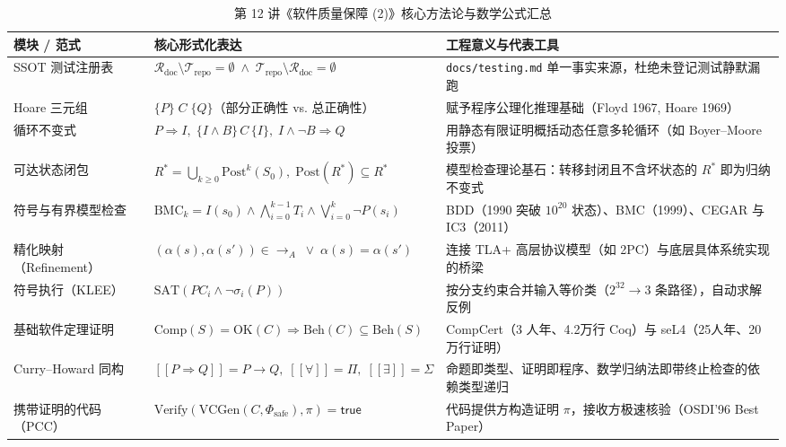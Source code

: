 \documentclass[a4paper]{article}
\begin{document}
\begin{table}[H]
\centering
\caption{第 12 讲《软件质量保障 (2)》核心方法论与数学公式汇总}
\label{tab:lecture12_summary}
\begin{tabular}{p{3.4cm}p{5.5cm}p{5.5cm}}
\toprule
\textbf{模块 / 范式} & \textbf{核心形式化表达} & \textbf{工程意义与代表工具} \\
\midrule
SSOT 测试注册表 & $\mathcal{R}_{\text{doc}} \setminus \mathcal{T}_{\text{repo}} = \emptyset \;\land\; \mathcal{T}_{\text{repo}} \setminus \mathcal{R}_{\text{doc}} = \emptyset$ & \texttt{docs/testing.md} 单一事实来源，杜绝未登记测试静默漏跑 \\
Hoare 三元组 & $\{P\}\; C\; \{Q\}$（部分正确性 vs. 总正确性） & 赋予程序公理化推理基础（Floyd 1967, Hoare 1969） \\
循环不变式 & $P \Rightarrow I,\; \{I \land B\}\, C\, \{I\},\; I \land \neg B \Rightarrow Q$ & 用静态有限证明概括动态任意多轮循环（如 Boyer--Moore 投票） \\
可达状态闭包 & $R^* = \bigcup_{k\ge 0} \mathrm{Post}^k(S_0),\; \mathrm{Post}(R^*) \subseteq R^*$ & 模型检查理论基石：转移封闭且不含坏状态的 $R^*$ 即为归纳不变式 \\
符号与有界模型检查 & $\mathrm{BMC}_k = I(s_0) \land \bigwedge_{i=0}^{k-1} T_i \land \bigvee_{i=0}^k \neg P(s_i)$ & BDD（1990 突破 $10^{20}$ 状态）、BMC（1999）、CEGAR 与 IC3（2011） \\
精化映射（Refinement） & $(\alpha(s), \alpha(s')) \in \to_A \;\lor\; \alpha(s) = \alpha(s')$ & 连接 TLA+ 高层协议模型（如 2PC）与底层具体系统实现的桥梁 \\
符号执行（KLEE） & $\mathrm{SAT}(\mathit{PC}_i \land \neg \sigma_i(P))$ & 按分支约束合并输入等价类（$2^{32} \to 3$ 条路径），自动求解反例 \\
基础软件定理证明 & $\mathrm{Comp}(S)=\mathrm{OK}(C) \Rightarrow \mathrm{Beh}(C) \subseteq \mathrm{Beh}(S)$ & CompCert（3 人年、4.2万行 Coq）与 seL4（25人年、20万行证明） \\
Curry--Howard 同构 & $[\![ P \Rightarrow Q ]\!] = P \to Q,\; [\![ \forall ]\!] = \Pi,\; [\![ \exists ]\!] = \Sigma$ & 命题即类型、证明即程序、数学归纳法即带终止检查的依赖类型递归 \\
携带证明的代码（PCC） & $\mathrm{Verify}(\mathrm{VCGen}(C, \Phi_{\text{safe}}), \pi) = \mathsf{true}$ & 代码提供方构造证明 $\pi$，接收方极速核验（OSDI'96 Best Paper） \\
\bottomrule
\end{tabular}
\end{table}
\end{document}
